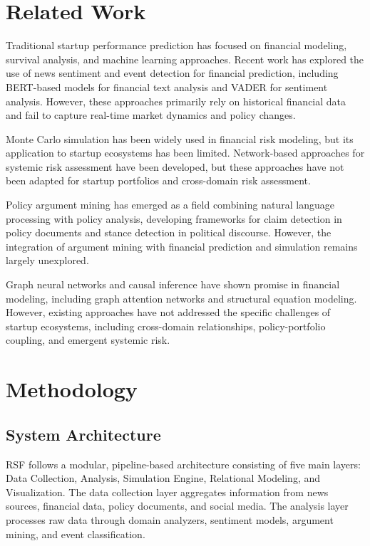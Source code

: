 \documentclass[conference]{IEEEtran}
\begin{document}
\section{Related Work}

Traditional startup performance prediction has focused on financial modeling, survival analysis, and machine learning approaches. Recent work has explored the use of news sentiment and event detection for financial prediction, including BERT-based models for financial text analysis and VADER for sentiment analysis. However, these approaches primarily rely on historical financial data and fail to capture real-time market dynamics and policy changes.

Monte Carlo simulation has been widely used in financial risk modeling, but its application to startup ecosystems has been limited. Network-based approaches for systemic risk assessment have been developed, but these approaches have not been adapted for startup portfolios and cross-domain risk assessment.

Policy argument mining has emerged as a field combining natural language processing with policy analysis, developing frameworks for claim detection in policy documents and stance detection in political discourse. However, the integration of argument mining with financial prediction and simulation remains largely unexplored.

Graph neural networks and causal inference have shown promise in financial modeling, including graph attention networks and structural equation modeling. However, existing approaches have not addressed the specific challenges of startup ecosystems, including cross-domain relationships, policy-portfolio coupling, and emergent systemic risk.

\section{Methodology}

\subsection{System Architecture}

RSF follows a modular, pipeline-based architecture consisting of five main layers: Data Collection, Analysis, Simulation Engine, Relational Modeling, and Visualization. The data collection layer aggregates information from news sources, financial data, policy documents, and social media. The analysis layer processes raw data through domain analyzers, sentiment models, argument mining, and event classification.
\end{document}
